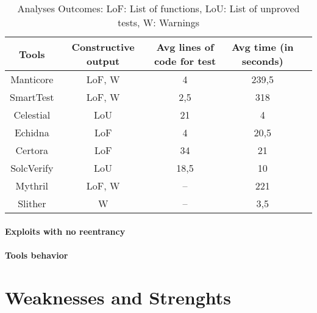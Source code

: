 \begin{center}
    \begin{table*}
        \footnotesize
        \caption{Analyses Outcomes: 
        LoF: List of functions, LoU: List of unproved tests, W: Warnings}
        \label{tab:Outcomes}
        \begin{tabular}{ccccc}
        \toprule
        Tools  & Constructive output &  Avg lines of code for test & Avg time (in seconds) \\
        \midrule
            Manticore & LoF, W  & 4  &  239,5 \\
            SmartTest & LoF, W & 2,5 &  318  \\
            Celestial & LoU & 21  &  4  \\
            Echidna & LoF  & 4  & 20,5 \\
            Certora & LoF   & 34 &  21  \\ 
            SolcVerify & LoU  &  18,5 &  10  \\
            Mythril & LoF, W  & --  &  221  \\ 
            Slither& W & --  &  3,5  \\ 
        \bottomrule
        \end{tabular}
    \end{table*}
\end{center}

\paragraph{Exploits with no reentrancy}

\paragraph{Tools behavior} 







\section{Weaknesses and Strenghts}

